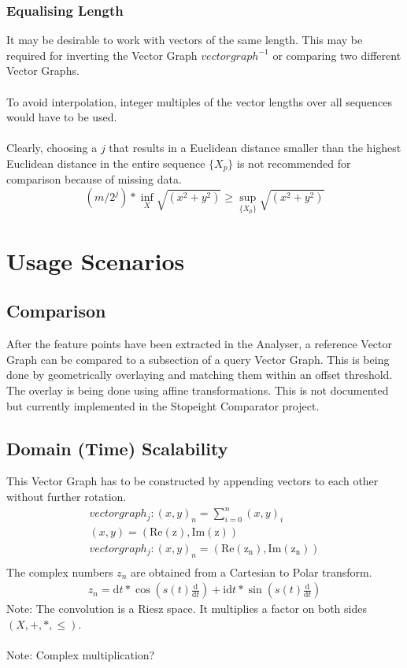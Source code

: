 \documentclass{report}
\begin{document}
\subsection{Equalising Length}
It may be desirable to work with vectors of the same length. This may be required for inverting the Vector Graph $vectorgraph^{-1}$ or comparing two different Vector Graphs.\\\\
To avoid interpolation, integer multiples of the vector lengths over all sequences would have to be used.\\\\
Clearly, choosing a $j$ that results in a Euclidean distance smaller than the highest Euclidean distance in the entire sequence $\{X_{p}\}$ is not recommended for comparison because of missing data.
\begin{equation}
(m/2^j)*\inf \limits _{X} \sqrt{(x^2+y^2)} \geq \sup \limits _{\{X_{p}\}} \sqrt{(x^2+y^2)}
\end{equation}

\chapter{Usage Scenarios}
\section{Comparison}
After the feature points have been extracted in the Analyser, a reference Vector Graph can be compared to a subsection of a query Vector Graph. This is being done by geometrically overlaying and matching them within an offset threshold. The overlay is being done using affine transformations. This is not documented but currently implemented in the Stopeight Comparator project.
\section{Domain (Time) Scalability}
This Vector Graph has to be constructed by appending vectors to each other without further rotation.
\begin{align}
vectorgraph_{j}: (x,y)_{n}=\sum \limits _{i=0}^{n}(x,y)_{i}\\
(x,y)=(\mathrm{Re(z)},\mathrm{Im(z)})\\
vectorgraph_{j}: (x,y)_{n}=(\mathrm{Re(z_{n})},\mathrm{Im(z_{n})})\\
\end{align}
The complex numbers $z_{n}$ are obtained from a Cartesian to Polar transform.
\begin{align}
z_{n}= \mathrm{d}t*\cos(s(t)\frac{\mathrm{d}}{\mathrm{d}t}) + \mathrm{i}\mathrm{d}t*\sin(s(t)\frac{\mathrm{d}}{\mathrm{d}t})
\end{align}
Note: The convolution is a Riesz space. It multiplies a factor on both sides $(X,+,*,\leq)$.\\\\
Note: Complex multiplication?\\\\
\end{document}
